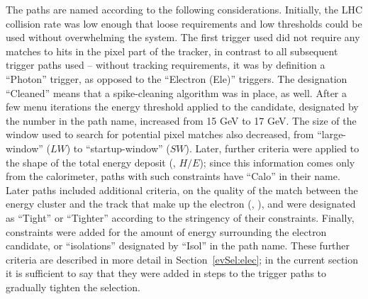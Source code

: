 The paths are named according to the following considerations.  
Initially, the LHC collision rate was low enough that loose 
requirements and low thresholds could be used without 
overwhelming the system.  
The first trigger used did not require any matches to 
hits in the pixel part of the tracker, 
in contrast to all subsequent trigger paths used -- 
without tracking requirements, it was by definition a 
``Photon'' trigger, 
as opposed to the ``Electron (Ele)'' triggers.  
The designation ``Cleaned'' means that a spike-cleaning 
algorithm was in place, as well.  
After a few menu iterations 
the energy threshold applied to the candidate, 
designated by the number in the path name,  
increased from 15 GeV to 17 GeV.  
The size of the window used to search for potential pixel 
matches also decreased, from ``large-window'' ($LW$) 
to ``startup-window'' ($SW$). %
Later, further criteria were applied to 
the shape of the total energy deposit (\sieie, $H/E$); %
since this information comes only from the calorimeter, 
paths with such constraints have ``Calo'' in their name.  
Later paths included additional criteria, 
on the quality of the match between the energy cluster and the track 
that make up the electron (\detain, \dphiin), 
and were designated as ``Tight'' or ``Tighter'' according 
to the stringency of their constraints.  
Finally, constraints were added for the amount of energy surrounding 
the electron candidate, or ``isolations'' 
designated by ``Isol'' in the path name.  
These further criteria are described in more detail in 
Section~\ref{evSel:elec}; 
in the current section it is sufficient to say that they 
were added in steps to the trigger paths to gradually tighten the 
selection.  







